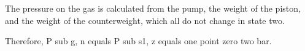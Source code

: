 The pressure on the gas is calculated from the pump, the weight of the piston, and the weight of the counterweight, which all do not change in state two.

Therefore, P sub g, n equals P sub s1, z equals one point zero two bar.